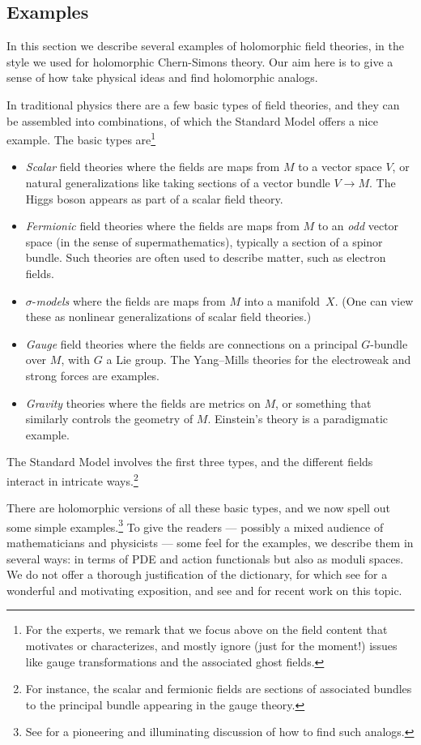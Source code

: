 \documentclass[11pt]{amsart}
\begin{document}
\subsection{Examples}

In this section we describe several examples of holomorphic field theories,
in the style we used for holomorphic Chern-Simons theory.
Our aim here is to give a sense of how take physical ideas and find holomorphic analogs.

In traditional physics there are a few basic types of field theories, 
and they can be assembled into combinations,
of which the Standard Model offers a nice example.
The basic types are\footnote{For the experts, we remark that we focus above on the field content that motivates or characterizes, and mostly ignore (just for the moment!) issues like gauge transformations and the associated ghost fields.}
\begin{itemize}
\item {\em Scalar} field theories where the fields are maps from $M$ to a vector space $V$, or natural generalizations like taking sections of a vector bundle $V \to M$. The Higgs boson appears as part of a scalar field theory.
\item {\em Fermionic} field theories where the fields are maps from $M$ to an {\em odd} vector space (in the sense of supermathematics), typically a section of a spinor bundle. Such theories are often used to describe matter, such as electron fields.
\item $\sigma$-{\em models} where the fields are maps from $M$ into a manifold~$X$. (One can view these as nonlinear generalizations of scalar field theories.)
\item {\em Gauge} field theories where the fields are connections on a principal $G$-bundle over $M$, with $G$ a Lie group. The Yang--Mills theories for the electroweak and strong forces are examples.
\item {\em Gravity} theories where the fields are metrics on $M$, or something that similarly controls the geometry of $M$. Einstein's theory is a paradigmatic example.
\end{itemize}
The Standard Model involves the first three types,
and the different fields interact in intricate ways.\footnote{For instance, the scalar and fermionic fields are sections of associated bundles to the principal bundle appearing in the gauge theory.}

There are holomorphic versions of all these basic types, 
and we now spell out some simple examples.\footnote{See \cite{Donaldson Thomas} for a pioneering and illuminating discussion of how to find such analogs.}
To give the readers --- possibly a mixed audience of mathematicians and physicists --- some feel for the examples, 
we describe them in several ways: 
in terms of PDE and action functionals but also as moduli spaces.
We do not offer a thorough justification of the dictionary, for which see \cite{CosSUSY} for a wonderful and motivating exposition,
and see \cite{AlfonsoYoung} and \cite{Steffens} for recent work on this topic.
\end{document}
